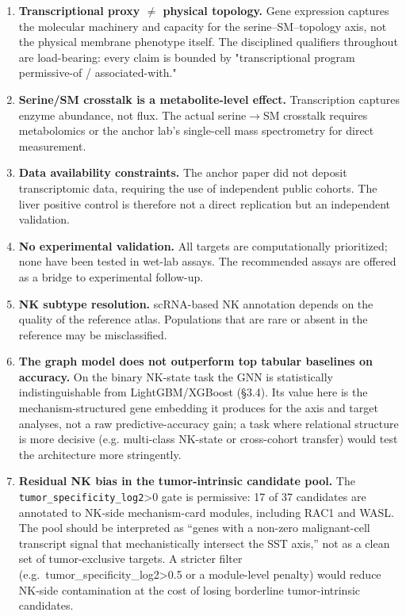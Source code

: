 \documentclass[modern,large,numbered,nocrop]{oup-authoring-template}
\begin{document}
\begin{enumerate}
\item \textbf{Transcriptional proxy $\neq$ physical topology.} Gene expression captures the molecular machinery and capacity for the serine--SM--topology axis, not the physical membrane phenotype itself. The disciplined qualifiers throughout are load-bearing: every claim is bounded by "transcriptional program permissive-of / associated-with."
\item \textbf{Serine/SM crosstalk is a metabolite-level effect.} Transcription captures enzyme abundance, not flux. The actual serine$\to$SM crosstalk requires metabolomics or the anchor lab's single-cell mass spectrometry for direct measurement.
\item \textbf{Data availability constraints.} The anchor paper did not deposit transcriptomic data, requiring the use of independent public cohorts. The liver positive control is therefore not a direct replication but an independent validation.
\item \textbf{No experimental validation.} All targets are computationally prioritized; none have been tested in wet-lab assays. The recommended assays are offered as a bridge to experimental follow-up.
\item \textbf{NK subtype resolution.} scRNA-based NK annotation depends on the quality of the reference atlas. Populations that are rare or absent in the reference may be misclassified.
\item \textbf{The graph model does not outperform top tabular baselines on accuracy.} On the binary NK-state task the GNN is statistically indistinguishable from LightGBM/XGBoost (\S{}3.4). Its value here is the mechanism-structured gene embedding it produces for the axis and target analyses, not a raw predictive-accuracy gain; a task where relational structure is more decisive (e.g. multi-class NK-state or cross-cohort transfer) would test the architecture more stringently.
\item \textbf{Residual NK bias in the tumor-intrinsic candidate pool.} The \texttt{tumor\_specificity\_log2}>0 gate is permissive: 17 of 37 candidates are annotated to NK-side mechanism-card modules, including RAC1 and WASL. The pool should be interpreted as ``genes with a non-zero malignant-cell transcript signal that mechanistically intersect the SST axis,'' not as a clean set of tumor-exclusive targets. A stricter filter (e.g.\ tumor\_specificity\_log2>0.5 or a module-level penalty) would reduce NK-side contamination at the cost of losing borderline tumor-intrinsic candidates.

\end{enumerate}
\end{document}
